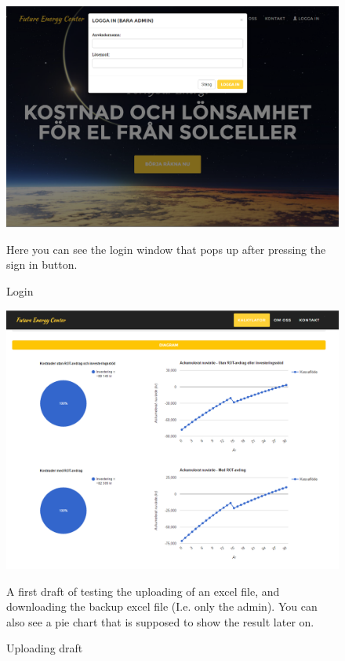 \documentclass[]{article}
\begin{document}
\begin{figure}[H]
	\centering
	\includegraphics[width=1.0\linewidth]{pic6}
	\caption{Login}
	\medskip
	\small
	Here you can see the login window that pops up after pressing the sign in button.
	\label{fig:pic6}
\end{figure}
\begin{figure}[H]
	\centering
	\includegraphics[width=1.0\linewidth]{pic7}
	\caption{Uploading draft}
	\medskip
	\small
	A first draft of testing the uploading of an excel file, and downloading the backup excel file (I.e. only the admin). You can also see a pie chart that is supposed to show the result later on.
	\label{fig:pic7}
\end{figure}
\end{document}
